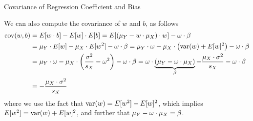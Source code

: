 %
\begin{frame}{Covariance of Regression Coefficient and Bias}

We can also compute the covariance of $w$ and $b$, as follows
\begin{align*}
    \operatorname{cov}(w, b) & = E[w \cdot b] - E[w] \cdot E[b]
    = E[(\mu_Y - w \cdot \mu_X)\cdot w] - \omega \cdot \beta\\
 & = \mu_Y \cdot E[w] - \mu_X \cdot E[w^2] - \omega \cdot \beta
    = \mu_Y \cdot \omega - \mu_X \cdot \bigl(\operatorname{var}(w) + E[w]^2 \bigr) -
    \omega
    \cdot \beta\\
    & = \mu_Y \cdot \omega - \mu_X \cdot \left( \frac{\sigma^2}{s_X} - \omega^2 \right)
    - \omega \cdot \beta
     = \omega \cdot \underbrace{(\mu_Y - \omega \cdot \mu_X)}_{\beta} - \frac{\mu_X \cdot \sigma^2
    }{s_X} - \omega \cdot \beta\\
    & = - \frac{\mu_X \cdot \sigma^2}{s_X}
\end{align*}
where we use the fact that $\operatorname{var}(w) = E[w^2] - E[w]^2$,
which implies $E[w^2] = \operatorname{var}(w) + E[w]^2$, and further that 
$\mu_Y - \omega \cdot \mu_X = \beta$.
\end{frame}

